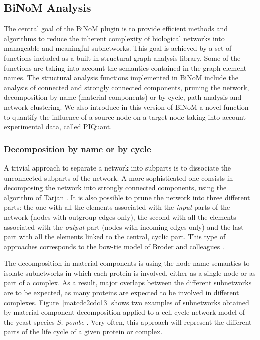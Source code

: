 \documentclass[10pt]{bmc_article}
\newenvironment{bmcformat}{\baselineskip20pt\sloppy\setboolean{publ}{false}}{\baselineskip20pt\sloppy}
\begin{document}
\begin{bmcformat}
\subsection*{BiNoM Analysis}
The central goal of the BiNoM plugin is to provide efficient methods
and algorithms to reduce the inherent complexity of biological networks into
manageable and meaningful subnetworks. This goal is achieved by a set of
functions included as a built-in structural graph analysis library. Some of the functions are taking into
account the semantics contained in the graph element names. 
The structural analysis functions implemented in BiNoM include the analysis of
connected and strongly connected components, pruning the network, decomposition
by name (material components) or by cycle, path analysis and network clustering.
We also introduce in this version of BiNoM a novel function to quantify the
influence of a source node on a target node taking into account experimental data, called PIQuant.

\subsubsection*{Decomposition by name or by cycle}
A trivial approach to separate a network into subparts is to dissociate the unconnected subparts
of the network. A more sophisticated one consists in decomposing the network into
strongly connected components, using the algorithm of Tarjan
\cite{tarjan1972depth}. It is also possible to prune the network into three different parts:
the one with all the elements associated with the \emph{input} parts of the network (nodes with outgroup edges only), the
second with all the elements associated with the \emph{output} part (nodes with incoming edges only) and the last
part with all the elements linked to the central, cyclic part. This type of approaches
corresponds to the bow-tie model of Broder and colleagues \cite{broder2000graph}.

The decomposition in material components is using the node name semantics to
isolate subnetworks in which each protein is involved, either as a single node or as part of a complex. As a result, major overlaps between
the different subnetworks are to be expected, as many proteins are expected to be involved in
different complexes. Figure~\ref{matcdc2cdc13} shows two examples of subnetworks
obtained by material component decomposition applied to a cell cycle network
model of the yeast species \textit{S. pombe} \cite{novak1998model}. Very often, this approach will represent
the different parts of the life cycle of a given protein or complex.


\end{bmcformat}
\end{document}
